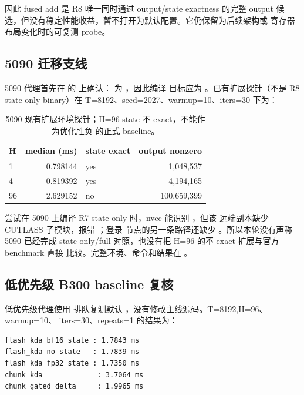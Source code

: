 因此 fused add 是 R8 唯一同时通过 output/state exactness 的完整 output
候选，但没有稳定性能收益，暂不打开为默认配置。它仍保留为后续架构或
寄存器布局变化时的可复测 probe。

\subsection{5090 迁移支线}

5090 代理首先在  的  上确认：
 为 ，因此编译
目标应为 。已有扩展探针（不是 R8
state-only binary）在 T=8192、seed=2027、warmup=10、iters=30 下为：

\begin{table}[htbp]
\centering
\small
\begin{tabular}{l r l r}
\toprule
H & median (ms) & state exact & output nonzero \\
\midrule
1  & 0.798144 & yes & 1,048,537 \\
4  & 0.819392 & yes & 4,194,165 \\
96 & 2.629152 & no  & 100,659,399 \\
\bottomrule
\end{tabular}
\caption{5090 现有扩展环境探针；H=96 state 不 exact，不能作为优化胜负
的正式 baseline。}
\end{table}

尝试在 5090 上编译 R7 state-only 时，nvcc 能识别 ，但该
远端副本缺少 CUTLASS 子模块，报错
；登录
节点的另一条路径还缺少 。所以本轮没有声称 5090 已经完成
state-only/full 对照，也没有把 H=96 的不 exact 扩展与官方 benchmark 直接
比较。完整环境、命令和结果在 。

\subsection{低优先级 B300 baseline 复核}

低优先级代理使用  排队复测默认
，没有修改主线源码。T=8192,H=96、warmup=10、
iters=30、repeats=1 的结果为：

\begin{lstlisting}
flash_kda bf16 state : 1.7843 ms
flash_kda no state   : 1.7839 ms
flash_kda fp32 state : 1.7350 ms
chunk_kda             : 3.7064 ms
chunk_gated_delta     : 1.9965 ms
\end{lstlisting}

